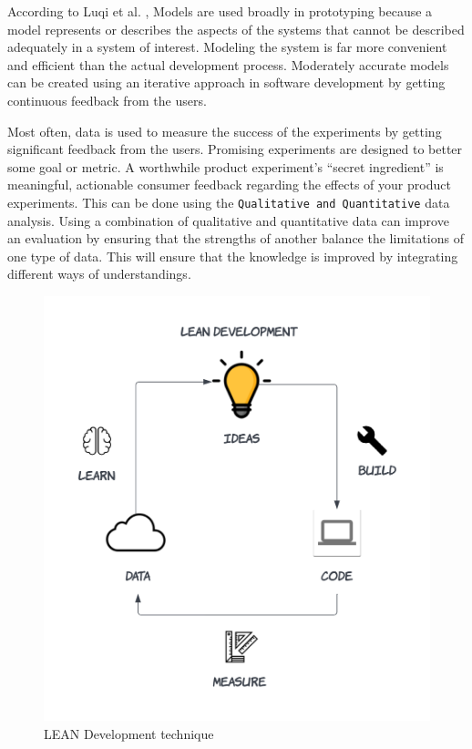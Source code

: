 According to Luqi et al. \cite{paper:prototyping:luqi}, Models are used broadly in prototyping because a model represents or describes the aspects of the systems that cannot be described adequately in a system of interest.
Modeling the system is far more convenient and efficient than the actual development process. 
Moderately accurate models can be created using an iterative approach in software development by getting continuous feedback from the users.

Most often, data is used to measure the success of the experiments by getting significant feedback from the users.
Promising experiments are designed to better some goal or metric. 
A worthwhile product experiment's ``secret ingredient'' is meaningful, actionable consumer feedback regarding the effects of your product experiments.
This can be done using the \texttt{Qualitative and Quantitative} data analysis.
Using a combination of qualitative and quantitative data can improve an evaluation by ensuring that the strengths of another balance the limitations of one type of data.
This will ensure that the knowledge is improved by integrating different ways of understandings.
\begin{figure}[ht]
    \centering
    \includegraphics[scale=0.24]{images/solution-ideas/LEAN.png}
    \caption{LEAN Development technique}
    \label{intro:fig:lean}
\end{figure}

